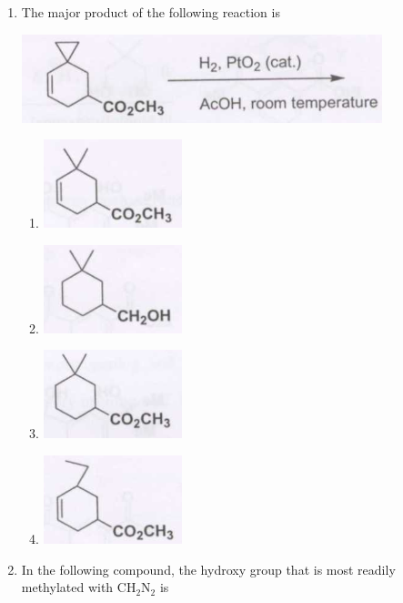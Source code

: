 \documentclass[12pt]{article}
\begin{document}
\begin{enumerate}
\item The major product of the following reaction is

\begin{center}
\includegraphics[width=0.6\columnwidth]{figs/q47.png}
\end{center}    \hfill{}
\begin{enumerate}
    \item \includegraphics[width=0.3\columnwidth]{figs/q47 a.png}
    \item \includegraphics[width=0.3\columnwidth]{figs/q47 b.png}
    \item \includegraphics[width=0.3\columnwidth]{figs/q47 c.png}
    \item \includegraphics[width=0.3\columnwidth]{figs/q47 d.png}
\end{enumerate}

\item In the following compound, the hydroxy group that is most readily methylated with CH$_2$N$_2$ is


\end{enumerate}
\end{document}

